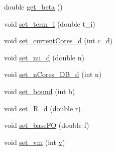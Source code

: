 \begin{DoxyCompactItemize}
double \hyperlink{classApplication_abc8a0a0b78144145d8aeefba5b3e256c}{get\-\_\-beta} ()
\item 
void \hyperlink{classApplication_a5a4a2ea2cb6d85978d9eee95d02c6689}{set\-\_\-term\-\_\-i} (double t\-\_\-i)
\item 
void \hyperlink{classApplication_a54b218ca87366e0897571416da763ba2}{set\-\_\-current\-Cores\-\_\-d} (int c\-\_\-d)
\item 
void \hyperlink{classApplication_a158448d570c0e25f7d7884af4fca0b8c}{set\-\_\-nu\-\_\-d} (double n)
\item 
void \hyperlink{classApplication_a3d116c903ecb0d92d5dc66f1210f227a}{set\-\_\-n\-Cores\-\_\-\-D\-B\-\_\-d} (int n)
\item 
void \hyperlink{classApplication_aa5bda390f99dea85e95f8d43b45c01a6}{set\-\_\-bound} (int b)
\item 
void \hyperlink{classApplication_a74d83f1191a1ab311c055da4d0d8d8d9}{set\-\_\-\-R\-\_\-d} (double r)
\item 
void \hyperlink{classApplication_a4931a778639958beec06c7efa6343602}{set\-\_\-base\-F\-O} (double f)
\item 
void \hyperlink{classApplication_a26df38cf838de9baf1ed5e5923b32124}{set\-\_\-vm} (int \hyperlink{classApplication_a57853498c230af817bc4173169847bfc}{v})
\end{DoxyCompactItemize}
